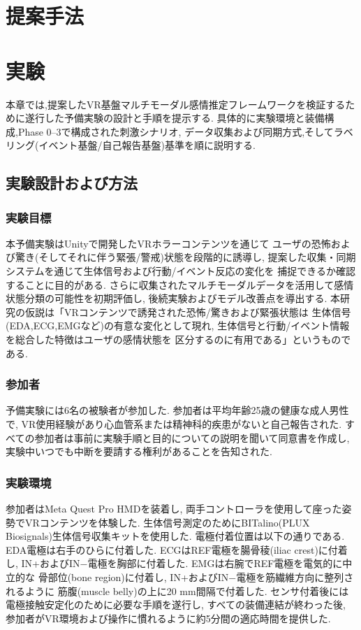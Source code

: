 \documentclass[book,paper=a4,fontsize=10pt,jafontscale=0.92]{jlreq}
\begin{document}
\chapter{提案手法}

\chapter{実験}
本章では,提案したVR基盤マルチモーダル感情推定フレームワークを検証するために遂行した予備実験の設計と手順を提示する.
具体的に実験環境と装備構成,Phase 0--3で構成された刺激シナリオ,
データ収集および同期方式,そしてラベリング(イベント基盤/自己報告基盤)基準を順に説明する.


\section{実験設計および方法}

\subsection{実験目標}

本予備実験はUnityで開発したVRホラーコンテンツを通じて
ユーザの恐怖および驚き(そしてそれに伴う緊張/警戒)状態を段階的に誘導し,
提案した収集・同期システムを通じて生体信号および行動/イベント反応の変化を
捕捉できるか確認することに目的がある.
さらに収集されたマルチモーダルデータを活用して感情状態分類の可能性を初期評価し,
後続実験およびモデル改善点を導出する.
本研究の仮説は「VRコンテンツで誘発された恐怖/驚きおよび緊張状態は
生体信号(EDA,ECG,EMGなど)の有意な変化として現れ,
生体信号と行動/イベント情報を総合した特徴はユーザの感情状態を
区分するのに有用である」というものである.

\subsection{参加者}

予備実験には6名の被験者が参加した.
参加者は平均年齢25歳の健康な成人男性で,
VR使用経験があり心血管系または精神科的疾患がないと自己報告された.
すべての参加者は事前に実験手順と目的についての説明を聞いて同意書を作成し,
実験中いつでも中断を要請する権利があることを告知された.

\subsection{実験環境}

参加者はMeta Quest Pro HMDを装着し,
両手コントローラを使用して座った姿勢でVRコンテンツを体験した.
生体信号測定のためにBITalino(PLUX Biosignals)生体信号収集キットを使用した.
電極付着位置は以下の通りである.
EDA電極は右手のひらに付着した.
ECGはREF電極を腸骨稜(iliac crest)に付着し,
IN+およびIN$-$電極を胸部に付着した.
EMGは右腕でREF電極を電気的に中立的な
骨部位(bone region)に付着し,
IN+およびIN$-$電極を筋繊維方向に整列されるように
筋腹(muscle belly)の上に20 mm間隔で付着した.
センサ付着後には電極接触安定化のために必要な手順を遂行し,
すべての装備連結が終わった後,
参加者がVR環境および操作に慣れるように約5分間の適応時間を提供した.
\end{document}

